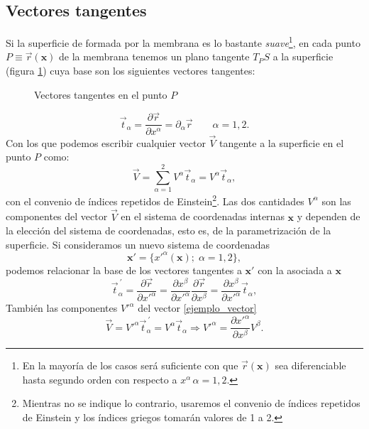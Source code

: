 \subsection{Vectores tangentes}

Si la superficie de formada por la membrana es lo bastante
\textit{suave}\footnote{En la mayoría de los casos será suficiente con que
 $\vec{r}(\mathbf{x})$ sea diferenciable hasta segundo orden con respecto a
 $x^{\alpha}\, \alpha=1,2$.}, en cada punto $P\equiv\vec{r}(\mathbf{x})$ de la
membrana tenemos un plano tangente $T_PS$ a la superficie (figura
\ref{vectores_tang-fig}) cuya base son los siguientes vectores tangentes:
\begin{figure}[h]
\centering
 
\caption{Vectores tangentes en el punto $P$}\label{vectores_tang-fig}
\end{figure}

\begin{equation*}
\vec{t}_{\alpha}=\frac{\partial \vec{r}}{\partial
  x^{\alpha}}=\partial_{\alpha}\vec{r} \qquad \alpha=1,2.
\end{equation*}
Con los que podemos escribir cualquier vector $\vec{V}$ tangente a la superficie en el punto $P$ como:
\begin{equation}\label{ejemplo_vector} 
  \vec{V}=\sum^2_{\alpha=1}V^{\alpha}\vec{t}_{\alpha}=V^{\alpha}\vec{t}_{\alpha},
\end{equation}
con el convenio de índices repetidos de Einstein\footnote{Mientras no se
  indique lo contrario, usaremos el convenio de índices repetidos de
  Einstein y los índices griegos tomarán valores de 1 a 2.}. Las dos cantidades
$V^{\alpha}$ son las componentes del vector $\vec{V}$ en el sistema de
coordenadas internas $\mathbf{x}$ y dependen de la elección del sistema de
coordenadas, esto es, de la parametrización de la superficie. Si consideramos
un nuevo sistema de coordenadas  
\begin{equation*}
 \mathbf{x}'=\{x'^{\alpha}(\mathbf{x});\; \alpha=1,2\},
\end{equation*}
podemos relacionar la base de los vectores tangentes a $\mathbf{x}'$ con la
asociada a $\mathbf{x}$
\begin{equation*}
\vec{t}_{\alpha}^{\ '}=\frac{\partial \vec{r}}{\partial x'^{\alpha}}=
\frac{\partial x^{\beta}}{\partial x'^{\alpha}}\frac{\partial \vec{r}}{\partial x^{\beta}}=\frac{\partial x^{\beta}}{\partial x'^{\alpha}}\vec{t}_{\alpha},
\end{equation*}
También las componentes $V'^{\alpha}$ del vector \eqref{ejemplo_vector}
\begin{equation} 
  \vec{V}=V'^{\alpha}\vec{t}_{\alpha}^{\
    '}=V^{\alpha}\vec{t}_{\alpha}\Rightarrow V'^{\alpha}=\frac{\partial x'^{\alpha}}{\partial x^{\beta}}V^{\beta}.
\end{equation}

